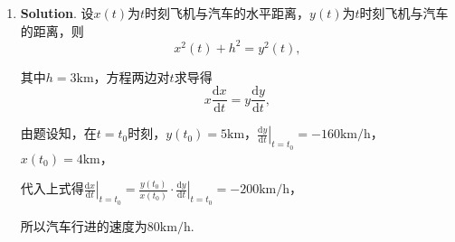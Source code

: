 \documentclass[../Main.tex]{subfiles}
\begin{document}
\begin{enumerate}
          当$x=-1$时，$\lim_{x\to-1}f(x)=\lim_{x\to-1}\frac{x\sin(1-x)}{-x(x-1)(x+1)}
              =\infty$，所以$x=-1$为无穷间断点.

    \item \textbf{Solution}. 设$x(t)$为$t$时刻飞机与汽车的水平距离，$y(t)$为$t$时刻飞机与汽车的距离，则
          \[
              x^{2}(t)+h^{2}=y^{2}(t),
          \]

          其中$h=3\mathrm{km}$，方程两边对$t$求导得
          \[
              x\frac{\mathrm{d}x}{\mathrm{d}t}=y\frac{\mathrm{d}y}{\mathrm{d}t},
          \]

          由题设知，在$t=t_{0}$时刻，$y(t_{0})=5\mathrm{km}$，$\left.\frac{\mathrm{d}y}{\mathrm{d}t}
              \right|_{t=t_0}=-160\mathrm{km/h}$，$x(t_{0})=4\mathrm{km}$，

          代入上式得$\left.\frac{\mathrm{d}x}{\mathrm{d}t}\right|_{t=t_0}=\frac{y(t_{0})}{x(t_{0})}
              \cdot\left.\frac{\mathrm{d}y}{\mathrm{d}t}\right|_{t=t_0}=-200\mathrm{km/h}$，

          所以汽车行进的速度为$80\mathrm{km/h}$.
\end{enumerate}
\end{document}
